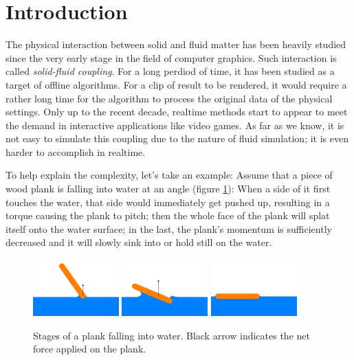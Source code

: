 \section{Introduction}

The physical interaction between solid and fluid matter has been heavily studied since the very early stage in the field of computer graphics.
Such interaction is called \emph{solid-fluid coupling}.
For a long perdiod of time, it has been studied as a target of offline algorithms.
For a clip of result to be rendered, it would require a rather long time for the algorithm to process the original data of the physical settings.
Only up to the recent decade, realtime methods start to appear to meet the demand in interactive applications like video games\citationNeeded.
As far as we know, it is not easy to simulate this coupling due to the nature of fluid simulation;
it is even harder to accomplish in realtime.

To help explain the complexity, let's take an example:
Assume that a piece of wood plank is falling into water at an angle (figure \ref{stages-of-a-plank-falling-into-water}):
When a side of it first touches the water, that side would immediately get pushed up, resulting in a torque causing the plank to pitch;
then the whole face of the plank will splat itself onto the water surface;
in the last, the plank's momentum is sufficiently decreased and it will slowly sink into or hold still on the water.

\begin{figure}[h]
	\begin{center}
		\includegraphics[width=1.3in]{figures/stages-of-a-plank-falling-into-water/1.png}
		\includegraphics[width=1.3in]{figures/stages-of-a-plank-falling-into-water/2.png}
		\includegraphics[width=1.3in]{figures/stages-of-a-plank-falling-into-water/3.png}
	\end{center}
	\caption{
		Stages of a plank falling into water.
		Black arrow indicates the net force applied on the plank.
	}
	\label{stages-of-a-plank-falling-into-water}
\end{figure}

